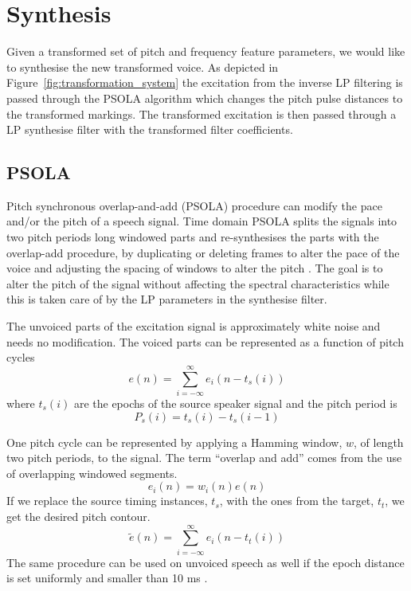 

\section{Synthesis} %
\label{sec:synthesis}
Given a transformed set of pitch and frequency feature parameters, we would like to synthesise the new transformed voice. As depicted in Figure~\ref{fig:transformation_system} the excitation from the inverse LP filtering is passed through the PSOLA algorithm which changes the pitch pulse distances to the transformed markings. The transformed excitation is then passed through a LP synthesise filter with the transformed filter coefficients.

\subsection{PSOLA} %
\label{sub:psola}
Pitch synchronous overlap-and-add (PSOLA) procedure can modify the pace and/or the pitch of a speech signal. Time domain PSOLA splits the signals into two pitch periods long windowed parts and re-synthesises the parts with the overlap-add procedure, by duplicating or deleting frames to alter the pace of the voice and adjusting the spacing of windows to alter the pitch \cite{taletek}. The goal is to alter the pitch of the signal without affecting the spectral characteristics while this is taken care of by the LP parameters in the synthesise filter. 

The unvoiced parts of the excitation signal is approximately white noise and needs no modification. The voiced parts can be represented as a function of pitch cycles
\begin{equation}
	e(n)=\sum_{i=-\infty}^{\infty}e_i(n-t_s(i))
\end{equation}
where $t_s(i)$ are the epochs of the source speaker signal and the pitch period is
\begin{equation}
	P_s(i) = t_s(i)-t_s(i-1)
\end{equation}

One pitch cycle can be represented by applying a Hamming window, $w$, of length two pitch periods, to the signal. The term ``overlap and add'' comes from the use of overlapping windowed segments.
\begin{equation}
	e_i(n)=w_i(n)e(n)
\end{equation}
If we replace the source timing instances, $t_s$, with the ones from the target, $t_t$, we get the desired pitch contour.
\begin{equation}
	\tilde{e}(n)=\sum_{i=-\infty}^{\infty}e_i(n-t_t(i)) %
\end{equation}
The same procedure can be used on unvoiced speech as well if the epoch distance is set uniformly and smaller than 10 ms \cite{moulines95a}.

